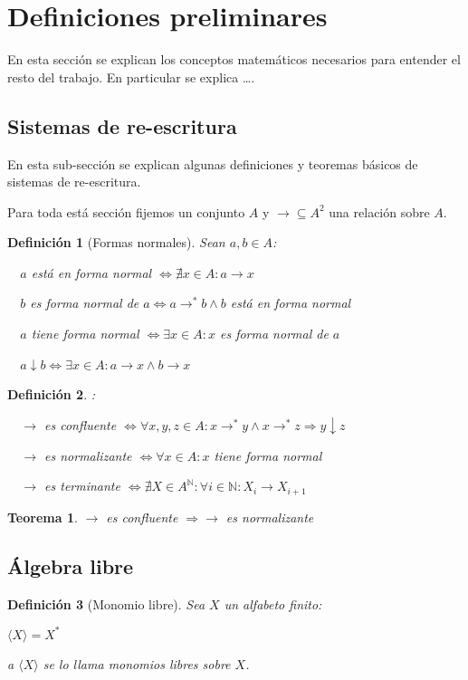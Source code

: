 \documentclass{amsbook}
\theoremstyle{customstyle}
\newtheorem{definition}{Definición}[section]
\newtheorem{theorem}{Teorema}[section]
\begin{document}
\fontsize{16pt}{19pt}\selectfont %


\section{Definiciones preliminares}

En esta sección se explican los conceptos matemáticos necesarios para entender el resto del trabajo.
En particular se explica …. %

\subsection{Sistemas de re-escritura}

En esta sub-sección se explican algunas definiciones y teoremas básicos de sistemas de re-escritura.

Para toda está sección fijemos un conjunto $A$ y $→ ⊆ A^2$ una relación sobre $A$.

\begin{definition}[Formas normales]
Sean $a, b ∈ A$:

  $a$ está en forma normal $⇔ ∄x ∈ A : a → x$

  $b$ es forma normal de $a ⇔ a →^* b ∧ b$ está en forma normal

  $a$ tiene forma normal $⇔ ∃x ∈ A : x$ es forma normal de $a$

  $a ↓ b ⇔ ∃x ∈ A : a → x ∧ b → x$
\end{definition}

\begin{definition}: %

  $→$ es confluente $⇔ ∀x, y, z ∈ A : x →^* y ∧ x →^*z ⇒ y ↓ z$

  $→$ es normalizante $⇔ ∀x ∈ A : x$ tiene forma normal

  $→$ es terminante $⇔ ∄X ∈ A^ℕ : ∀i ∈ ℕ : X_i → X_{i + 1}$
\end{definition}

\begin{theorem}\label{thm:confluente_implica_normalizante}
$→$ es confluente $⇒ →$ es normalizante
\end{theorem}


\subsection{Álgebra libre}

\begin{definition}[Monomio libre]
Sea $X$ un alfabeto finito:

$⟨X⟩ = X^*$

a $⟨X⟩$ se lo llama monomios libres sobre $X$.
\end{definition}
\end{document}
